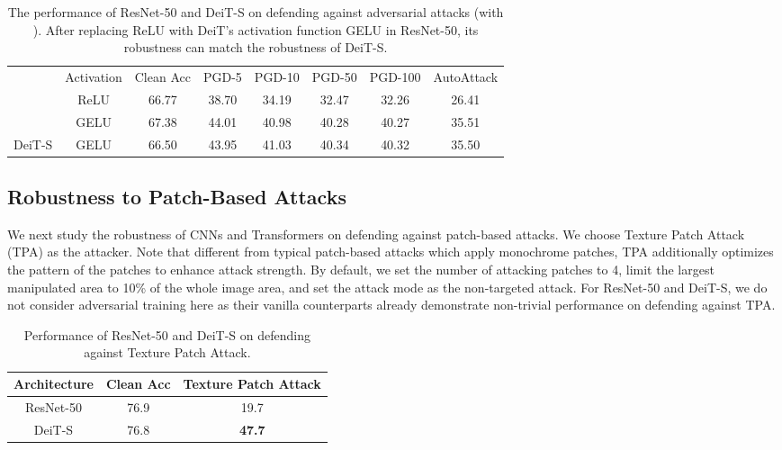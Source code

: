 \documentclass{article}
\begin{document}
\setlength{\tabcolsep}{3pt}
\begin{table}[!ht]
\vspace{-0.25em}
\caption{The performance of ResNet-50 and DeiT-S on defending against adversarial attacks (with ). After replacing ReLU with DeiT's activation function GELU in ResNet-50, its robustness can match the robustness of DeiT-S.} 
\footnotesize
\centering
\begin{tabular}{c|c|c|c|c|c|c|c}
\shline
                            & Activation & Clean Acc & PGD-5 & PGD-10 & PGD-50 &PGD-100 & AutoAttack \\ \shline
\multirow{2}{*}{ResNet-50}  & ReLU    &    66.77  &  38.70    &   34.19    &   32.47     &   32.26 & 26.41   \\ 
                            & GELU     &   67.38     &   44.01         &   40.98         &   40.28       & 40.27    & 35.51   \\ \hline
DeiT-S & GELU      & 66.50       &   43.95    &   41.03     &   40.34     &  40.32 & 35.50 \\ \hline
\end{tabular}
\label{tab:activation}
\end{table}



\subsection{Robustness to Patch-Based Attacks} 
We next study the robustness of CNNs and Transformers on defending against patch-based attacks. We choose Texture Patch Attack (TPA) \cite{yang2020patchattack} as the attacker. Note that different from typical patch-based attacks which apply monochrome patches, TPA additionally optimizes the pattern of the patches to enhance attack strength. By default, we set the number of attacking patches to 4, limit the largest manipulated area to 10\% of the whole image area, and set the attack mode as the non-targeted attack. For ResNet-50 and DeiT-S, we do not consider adversarial training here as their vanilla counterparts already demonstrate non-trivial performance on defending against TPA.


\begin{table}[!b]
\vspace{-1.25em}
\caption{Performance of ResNet-50 and DeiT-S on defending against Texture Patch Attack.} 
\footnotesize
\centering
\begin{tabular}{c|c|c}
\shline
Architecture & Clean Acc & Texture Patch Attack \\ \hline
ResNet-50                     &     76.9            &    19.7            \\ 
DeiT-S                    &      76.8              &   \textbf{47.7}              \\ \hline
\end{tabular}
\label{tab:patchattack}
\end{table}
\end{document}

